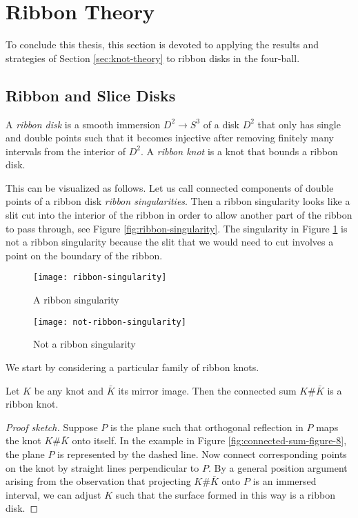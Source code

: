 \documentclass[main.tex]{subfiles}
\begin{document}
\section{Ribbon Theory} \label{sec:ribbon-theory}
To conclude this thesis, this section is devoted to applying the results and strategies of Section \ref{sec:knot-theory} to ribbon disks in the four-ball. 

\subsection{Ribbon and Slice Disks}\label{subsec:ribbons}
A \textit{ribbon disk} is a smooth immersion $D^2 \rightarrow S^3$ of a disk $D^2$ that only has single and double points such that it becomes injective after removing finitely many intervals from the interior of $D^2$. A \textit{ribbon knot} is a knot that bounds a ribbon disk.

This can be visualized as follows. Let us call connected components of double points of a ribbon disk \textit{ribbon singularities}. Then a ribbon singularity looks like a slit cut into the interior of the ribbon in order to allow another part of the ribbon to pass through, see Figure \ref{fig:ribbon-singularity}. The singularity in Figure \ref{fig:not-ribbon-singularity} is not a ribbon singularity because the slit that we would need to cut involves a point on the boundary of the ribbon.

\begin{figure}[htb]
\centering
\begin{minipage}{0.5\textwidth}
\centering
\texttt{[image: ribbon-singularity]}
\caption{A ribbon singularity}
\label{fig:ribbon-singularity}
\end{minipage}%
\begin{minipage}{0.5\textwidth}
\centering
\texttt{[image: not-ribbon-singularity]}
\caption{Not a ribbon singularity}
\label{fig:not-ribbon-singularity}
\end{minipage}
\end{figure}

We start by considering a particular family of ribbon knots.

\begin{theorem}\label{thm:connected-sum-ribbon}
Let $K$ be any knot and $\bar{K}$ its mirror image. Then the connected sum $K\#\bar{K}$ is a ribbon knot.
\end{theorem}

\begin{proof}[Proof sketch]
Suppose $P$ is the plane such that orthogonal reflection in $P$ maps the knot $K\#\bar{K}$ onto itself. In the example in Figure \ref{fig:connected-sum-figure-8}, the plane $P$ is represented by the dashed line. 
Now connect corresponding points on the knot by straight lines perpendicular to $P$. By a general position argument arising from the observation that projecting $K\#\bar{K}$ onto $P$ is an immersed interval, we can adjust $K$ such that the surface formed in this way is a ribbon disk.
\end{proof}
\end{document}
